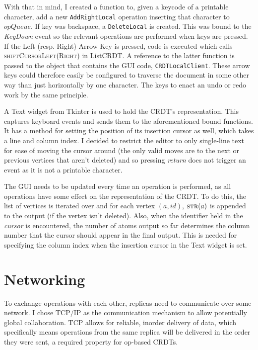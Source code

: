 \documentclass[diss.tex]{subfiles}
\begin{document}
With that in mind, I created a function to, given a keycode of a printable character, add a new \texttt{AddRightLocal} operation inserting that character to $opQueue$.  If key was backspace, a \texttt{DeleteLocal} is created. This was bound to the \textit{KeyDown} event so the relevant operations are performed when keys are pressed. If the Left (resp. Right) Arrow Key is pressed, code is executed which calls \textsc{shiftCursorLeft(Right)} in ListCRDT. A reference to the latter function is passed to the object that contains the GUI code, \texttt{CRDTLocalClient}. These arrow keys could therefore easily be configured to traverse the document in some other way than just horizontally by one character. The keys to enact an undo or redo work by the same principle.

A Text widget from Tkinter is used to hold the CRDT's representation. This captures keyboard events and sends them to the aforementioned bound functions. It has a method for setting the position of its insertion cursor as well, which takes a line and column index. I decided to restrict the editor to only single-line text for ease of moving the cursor around (the only valid moves are to the next or previous vertices that aren't deleted) and so pressing \textit{return} does not trigger an event as it is not a printable character.

The GUI needs to be updated every time an operation is performed, as all operations have some effect on the representation of the CRDT. To do this, the list of vertices is iterated over and for each vertex $(a,id)$, $\textsc{str}(a)$ is appended to the output (if the vertex isn't deleted). Also, when the identifier held in the \textit{cursor} is encountered, the number of atoms output so far determines the column number that the cursor should appear in the final output. This is needed for specifying the column index when the insertion cursor in the Text widget is set.







\section{Networking}\label{sec:networking}
To exchange operations with each other, replicas need to communicate over some network. I chose TCP/IP as the communication mechanism to allow potentially global collaboration. TCP allows for reliable, inorder delivery of data, which specifically means operations from the same replica will be delivered in the order they were sent, a required property for op-based CRDTs. 
\end{document}
